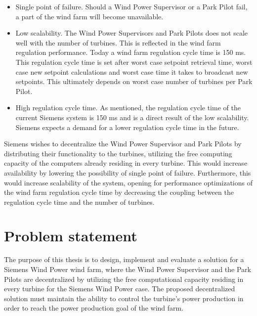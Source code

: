 \begin{itemize} 
	\item Single point of failure. Should a Wind Power Supervisor or a Park Pilot fail, a part of the wind farm will become unavailable.
	\item Low scalability. The Wind Power Supervisors and Park Pilots does not scale well with the number of turbines. This is reflected in the wind farm regulation performance. Today a wind farm regulation cycle time is 150 ms. This regulation cycle time is set after worst case setpoint retrieval time, worst case new setpoint calculations and worst case time it takes to broadcast new setpoints. This ultimately depends on worst case number of turbines per Park Pilot.
	\item High regulation cycle time. As mentioned, the regulation cycle time of the current Siemens system is 150 ms and is a direct result of the low scalability. Siemens expects a demand for a lower regulation cycle time in the future.
\end{itemize}

Siemens wishes to decentralize the Wind Power Supervisor and Park Pilots by distributing their functionality to the turbines, utilizing the free computing capacity of the computers already residing in every turbine. This would increase availability by lowering the possibility of single point of failure. Furthermore, this would increase scalability of the system, opening for performance optimizations of the wind farm regulation cycle time by decreasing the coupling between the regulation cycle time and the number of turbines. 

\section{Problem statement}
\label{sec:problemStatement}

The purpose of this thesis is to design, implement and evaluate a solution for a Siemens Wind Power wind farm, where the Wind Power Supervisor and the Park Pilots are decentralized by utilizing the free computational capacity residing in every turbine for the Siemens Wind Power case. The proposed decentralized solution must maintain the ability to control the turbine's power production in order to reach the power production goal of the wind farm. 

